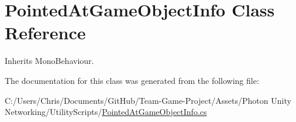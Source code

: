 \hypertarget{class_pointed_at_game_object_info}{}\section{Pointed\+At\+Game\+Object\+Info Class Reference}
\label{class_pointed_at_game_object_info}


Inherits Mono\+Behaviour.



The documentation for this class was generated from the following file\+:\begin{DoxyCompactItemize}
\item 
C\+:/\+Users/\+Chris/\+Documents/\+Git\+Hub/\+Team-\/\+Game-\/\+Project/\+Assets/\+Photon Unity Networking/\+Utility\+Scripts/\hyperlink{_pointed_at_game_object_info_8cs}{Pointed\+At\+Game\+Object\+Info.\+cs}\end{DoxyCompactItemize}

